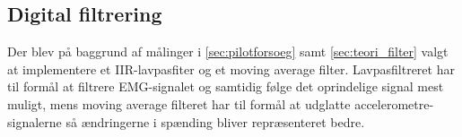 \subsection{Digital filtrering}
Der blev på baggrund af målinger i \autoref{sec:pilotforsoeg} samt \autoref{sec:teori_filter} valgt at implementere et IIR-lavpasfiter og et moving average filter. Lavpasfiltreret har til formål at filtrere EMG-signalet og samtidig følge det oprindelige signal mest muligt, mens moving average filteret har til formål at udglatte accelerometre-signalerne så ændringerne i spænding bliver repræsenteret bedre. 